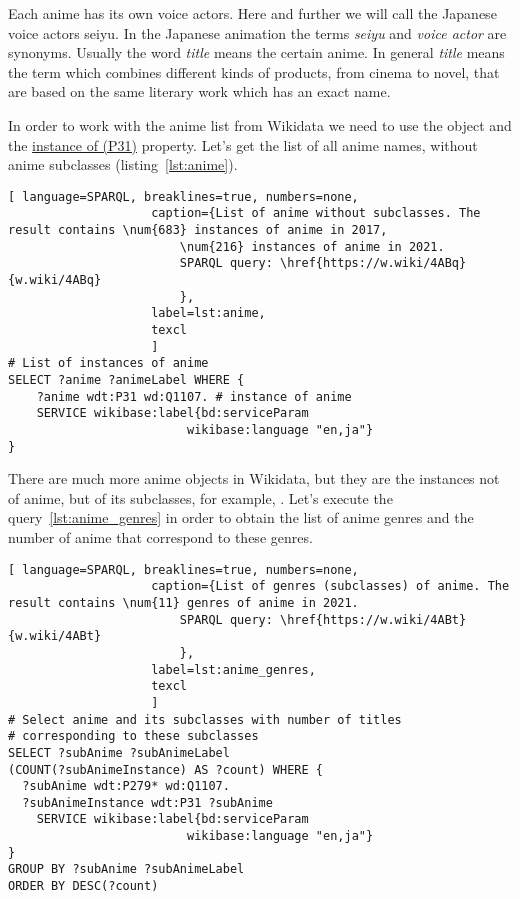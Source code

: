 Each anime has its own voice actors. Here and further we will call the Japanese voice actors seiyu. In the Japanese animation the terms \emph{seiyu} and \emph{voice actor} are synonyms. Usually the word \emph{title} means the certain anime. In general \emph{title} means the term which combines different kinds of products, from cinema to novel, that are based on the same literary work which has an exact name.

In order to work with the anime list from Wikidata we need to use the  object and the \href{https://www.wikidata.org/wiki/Property:P31}{instance of (P31)} property. Let's get the list of all anime names, without anime subclasses (listing~\protect\ref{lst:anime}).

\begin{lstlisting}[ language=SPARQL, breaklines=true, numbers=none,
                    caption={List of anime without subclasses. The result contains \num{683} instances of anime in 2017, 
                        \num{216} instances of anime in 2021.
                        SPARQL query: \href{https://w.wiki/4ABq}{w.wiki/4ABq}
                        },
                    label=lst:anime,
                    texcl 
                    ]
# List of instances of anime
SELECT ?anime ?animeLabel WHERE {
    ?anime wdt:P31 wd:Q1107. # instance of anime
    SERVICE wikibase:label{bd:serviceParam
					     wikibase:language "en,ja"}
}
\end{lstlisting}%

There are much more anime objects in Wikidata, but they are the instances not of anime, but of its subclasses, for example, . Let's execute the query~\protect\ref{lst:anime_genres} in order to obtain the list of anime genres and the number of anime that correspond to these genres.

\begin{lstlisting}[ language=SPARQL, breaklines=true, numbers=none,
                    caption={List of genres (subclasses) of anime. The result contains \num{11} genres of anime in 2021.
                        SPARQL query: \href{https://w.wiki/4ABt}{w.wiki/4ABt}
                        },
                    label=lst:anime_genres,
                    texcl 
                    ]
# Select anime and its subclasses with number of titles
# corresponding to these subclasses
SELECT ?subAnime ?subAnimeLabel
(COUNT(?subAnimeInstance) AS ?count) WHERE {
  ?subAnime wdt:P279* wd:Q1107.
  ?subAnimeInstance wdt:P31 ?subAnime
    SERVICE wikibase:label{bd:serviceParam
					     wikibase:language "en,ja"}
}
GROUP BY ?subAnime ?subAnimeLabel
ORDER BY DESC(?count)
\end{lstlisting}%

